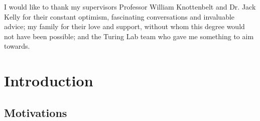 \documentclass[a4paper,11pt,titlepage]{article}
\begin{document}
\clearpage
\newpage 

\thispagestyle{plain}
\null\newpage

\clearpage
\thispagestyle{plain}
\par{}

I would like to thank my supervisors Professor William Knottenbelt and Dr. Jack Kelly for their constant optimism, fascinating conversations and invaluable advice; my family for their love and support, without whom this degree would not have been possible; and the Turing Lab team who gave me something to aim towards.

\clearpage

\tableofcontents

\clearpage

\section{Introduction}

	\subsection{Motivations}
\end{document}
